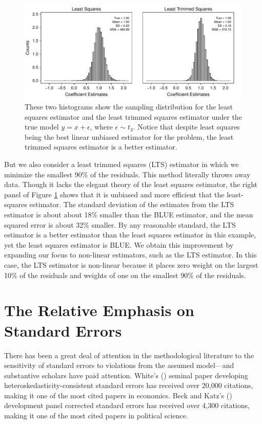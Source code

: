 \documentclass[12pt]{article}
\begin{document}
\begin{figure}[h!]
\begin{center}
\includegraphics[scale = .7]{figs/lts-illustration.pdf}
\caption{These two histograms show the sampling distribution for the least squares estimator and the least trimmed squares estimator under the true model $y = x + \epsilon$, where $\epsilon \sim t_3$. 
Notice that despite least squares being the best linear unbiased estimator for the problem, the least trimmed squares estimator is a better estimator.}\label{fig:lts-illustration}
\end{center}
\end{figure}

But we also consider a least trimmed squares (LTS) estimator in which we minimize the smallest 90\% of the residuals. 
This method literally throws away data. 
Though it lacks the elegant theory of the least squares estimator, the right panel of Figure \ref{fig:lts-illustration} shows that it is unbiased and more efficient that the least-squares estimator. 
The standard deviation of the estimates from the LTS estimator is about about 18\% smaller than the BLUE estimator, and the mean squared error is about 32\% smaller. 
By any reasonable standard, the LTS estimator is a better estimator than the least squares estimator in this example, yet the least squares estimator is BLUE. 
We obtain this improvement by expanding our focus to non-linear estimators, such as the LTS estimator. 
In this case, the LTS estimator is non-linear because it places zero weight on the largest 10\% of the residuals and weights of one on the smallest 90\% of the residuals.

\section*{The Relative Emphasis on Standard Errors}

There has been a great deal of attention in the methodological literature to the sensitivity of standard errors to violations from the assumed model---and substantive scholars have paid attention.
White's (\citeyear{White1980}) seminal paper developing heteroskedasticity-consistent standard errors has received over 20,000 citations, making it one of the most cited papers in economics.
Beck and Katz's (\citeyear{BeckKatz1995}) development panel corrected standard errors has received over 4,300 citations, making it one of the most cited papers in political science.
\end{document}
